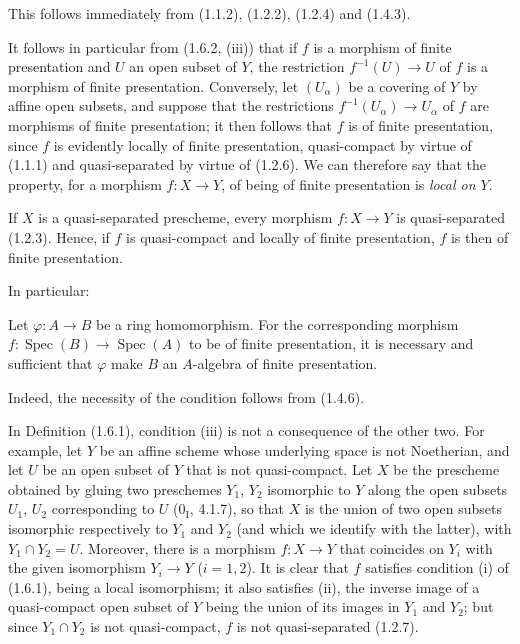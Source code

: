 This follows immediately from (1.1.2), (1.2.2), (1.2.4) and (1.4.3).

It follows in particular from (1.6.2, (iii)) that if $f$ is a morphism of
finite presentation and $U$ an open subset of $Y$, the restriction
$f^{-1}(U)\to U$ of $f$ is a morphism of finite presentation. Conversely,
let $(U_\alpha)$ be a covering of $Y$ by affine open subsets, and suppose
that the restrictions $f^{-1}(U_\alpha)\to U_\alpha$ of $f$ are
morphisms of finite presentation; it then follows that $f$ is of finite
presentation, since $f$ is evidently locally of finite presentation,
quasi-compact by virtue of (1.1.1) and quasi-separated by virtue of (1.2.6).
We can therefore say that the property, for a morphism $f:X\to Y$, of being
of finite presentation is \emph{local on $Y$}.

If $X$ is a quasi-separated prescheme, every morphism $f:X\to Y$ is
quasi-separated (1.2.3). Hence, if $f$ is quasi-compact and locally of finite
presentation, $f$ is then of finite presentation.

In particular:

\begin{corollary}[1.6.3]
\label{IV.1.6.3}
Let $\varphi:A\to B$ be a ring homomorphism. For the corresponding
morphism $f:\operatorname{Spec}(B)\to\operatorname{Spec}(A)$ to be of finite presentation, it is necessary and
sufficient that $\varphi$ make $B$ an $A$-algebra of finite presentation.
\end{corollary}

Indeed, the necessity of the condition follows from (1.4.6).

\begin{remark}[1.6.4]
\label{IV.1.6.4}
In Definition (1.6.1), condition (iii) is not a consequence of the other
two. For example, let $Y$ be an affine scheme whose underlying space is not
Noetherian, and let $U$ be an open subset of $Y$ that is not quasi-compact.
Let $X$ be the prescheme obtained by gluing two preschemes $Y_1$, $Y_2$
isomorphic to $Y$ along the open subsets $U_1$, $U_2$ corresponding to $U$
(0$_{\mathrm I}$,
4.1.7), so that $X$ is the union of two open subsets isomorphic respectively
to $Y_1$ and $Y_2$ (and which we identify with the latter), with
$Y_1\cap Y_2=U$. Moreover, there is a morphism $f:X\to Y$ that coincides on
$Y_i$ with the given isomorphism $Y_i\to Y$ ($i=1,2$). It is clear that $f$
satisfies condition (i) of (1.6.1), being a local isomorphism; it also
satisfies (ii), the inverse image of a quasi-compact open subset of $Y$ being
the union of its images in $Y_1$ and $Y_2$; but since $Y_1\cap Y_2$ is not
quasi-compact, $f$ is not quasi-separated (1.2.7).
\end{remark}

